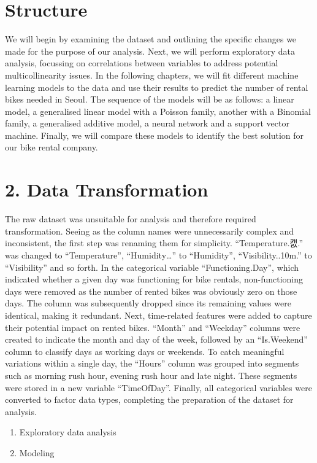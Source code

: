 \documentclass[
]{article}
\begin{document}
\section{Structure}\label{structure}

We will begin by examining the dataset and outlining the specific
changes we made for the purpose of our analysis. Next, we will perform
exploratory data analysis, focussing on correlations between variables
to address potential multicollinearity issues. In the following
chapters, we will fit different machine learning models to the data and
use their results to predict the number of rental bikes needed in Seoul.
The sequence of the models will be as follows: a linear model, a
generalised linear model with a Poisson family, another with a Binomial
family, a generalised additive model, a neural network and a support
vector machine. Finally, we will compare these models to identify the
best solution for our bike rental company.

\section{2. Data Transformation}\label{data-transformation}

The raw dataset was unsuitable for analysis and therefore required
transformation. Seeing as the column names were unnecessarily complex
and inconsistent, the first step was renaming them for simplicity.
``Temperature.캜.'' was changed to ``Temperature'', ``Humidity\ldots{}''
to ``Humidity'', ``Visibility..10m.'' to ``Visibility'' and so forth. In
the categorical variable ``Functioning.Day'', which indicated whether a
given day was functioning for bike rentals, non-functioning days were
removed as the number of rented bikes was obviously zero on those days.
The column was subsequently dropped since its remaining values were
identical, making it redundant. Next, time-related features were added
to capture their potential impact on rented bikes. ``Month'' and
``Weekday'' columns were created to indicate the month and day of the
week, followed by an ``Is.Weekend'' column to classify days as working
days or weekends. To catch meaningful variations within a single day,
the ``Hours'' column was grouped into segments such as morning rush
hour, evening rush hour and late night. These segments were stored in a
new variable ``TimeOfDay''. Finally, all categorical variables were
converted to factor data types, completing the preparation of the
dataset for analysis.

\begin{enumerate}
\def\labelenumi{\arabic{enumi}.}
\setcounter{enumi}{2}
\item
  Exploratory data analysis
\item
  Modeling
\end{enumerate}
\end{document}
